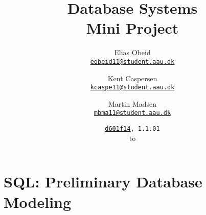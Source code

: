\documentclass[a4paper, 12pt, twoside, article]{memoir}
\title{Database Systems\\Mini Project}
\date{
  \texttt{\href{mailto:d601f14@cs.aau.dk}{d601f14}, 1.1.01}\\
  \protect\formatdate{6}{2}{2014} to \protect\formatdate{6}{2}{2014}
}
\author{
  Elias Obeid\\
  \href{mailto:eobeid11@student.aau.dk}{\texttt{eobeid11@student.aau.dk}}
  \and
  Kent Caspersen\\
  \href{mailto:kcaspe11@student.aau.dk}{\texttt{kcaspe11@student.aau.dk}}
  \and
  Martin Madsen\\
  \href{mailto:mbma11@student.aau.dk}{\texttt{mbma11@student.aau.dk}}
}
\begin{document}
\frontmatter

\maketitle
\pagebreak

\mainmatter



\appendix

\chapter{SQL: Preliminary Database Modeling}\label{sec:sqlPre}
\inputminted{sql}{1-06.02.14/selfStudy1db.sql}
\end{document}
